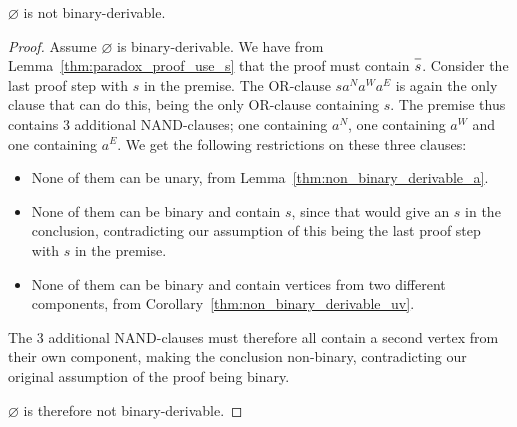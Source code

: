 \begin{theorem}
  $\varnothing$ is not binary-derivable.
  \label{thm:non_binary_derivable_paradox}
\end{theorem}
\begin{proof}
  Assume $\varnothing$ is binary-derivable.
  We have from Lemma~\ref{thm:paradox_proof_use_s} that the proof must contain $\ol{s}$.
  Consider the last proof step with $s$ in the premise.
  The OR-clause $sa^Na^Wa^E$ is again the only clause that can do this, being the only OR-clause containing $s$.
  The premise thus contains 3 additional NAND-clauses;
  one containing $a^N$, one containing $a^W$ and one containing $a^E$.
  We get the following restrictions on these three clauses:
  \begin{itemize}
    \item None of them can be unary, from Lemma~\ref{thm:non_binary_derivable_a}.
    \item None of them can be binary and contain $s$, since that would give an $s$ in the conclusion, contradicting our assumption of this being the last proof step with $s$ in the premise.
    \item None of them can be binary and contain vertices from two different components, from Corollary~\ref{thm:non_binary_derivable_uv}.
  \end{itemize}
  The 3 additional NAND-clauses must therefore all contain a second vertex from their own component,
  making the conclusion non-binary, contradicting our original assumption of the proof being binary.

  $\varnothing$ is therefore not binary-derivable.
\end{proof}
